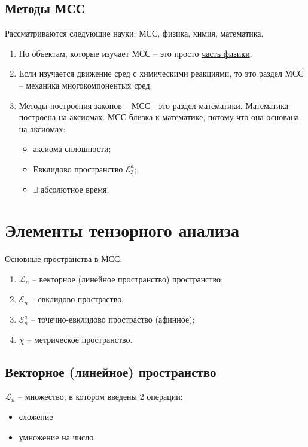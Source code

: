 \subsection{Методы МСС}

Рассматриваются следующие науки: МСС, физика, химия, математика.

\begin{enumerate}
  \item По объектам, которые изучает МСС -- это просто \underline{часть физики}.

  \item Если изучается движение сред с химическими реакциями, то это раздел МСС -- механика
    многокомпонентых сред.

  \item Методы построения законов -- МСС - это раздел математики. Математика построена на аксиомах.
    МСС близка к математике, потому что она основана на аксиомах:
    \begin{itemize}
      \item аксиома сплошности;
      \item Евклидово пространство $\mathcal{E}_3^a$;
      \item $\exists$ абсолютное время.
    \end{itemize}
\end{enumerate}


\section{Элементы тензорного анализа}

Основные пространства в МСС:
\begin{enumerate}
  \item $\mathcal{L}_n$ -- векторное (линейное пространство) пространство;
  \item $\mathcal{E}_n$ -- евклидово простраство;
  \item $\mathcal{E}_n^a$ -- точечно-евклидово простраство (афинное);
  \item $\chi$ -- метрическое пространство.
\end{enumerate}

\subsection{Векторное (линейное) пространство}

\begin{definition}
  $\mathcal{L}_n$ -- множество, в котором введены 2 операции:
  \begin{itemize}
    \item сложение
    \item умножение на число
  \end{itemize}
\end{definition}

